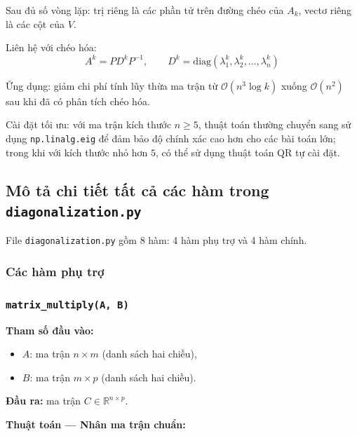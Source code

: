 \documentclass[a4paper,12pt]{report}
\begin{document}
\noindent Sau đủ số vòng lặp: trị riêng là các phần tử trên đường chéo của $A_k$, vectơ riêng là các cột của $V$.

\medskip

\noindent Liên hệ với chéo hóa:
\[
  A^k = P D^k P^{-1}, \qquad
  D^k = \mathrm{diag}(\lambda_1^k, \lambda_2^k, \ldots, \lambda_n^k)
\]

\noindent Ứng dụng: giảm chi phí tính lũy thừa ma trận từ $\mathcal{O}(n^3 \log k)$ xuống $\mathcal{O}(n^2)$ sau khi đã có phân tích chéo hóa.

\medskip

\noindent Cài đặt tối ưu: với ma trận kích thước $n \geq 5$, thuật toán thường chuyển sang sử dụng \texttt{np.linalg.eig} để đảm bảo độ chính xác cao hơn cho các bài toán lớn; trong khi với kích thước nhỏ hơn $5$, có thể sử dụng thuật toán QR tự cài đặt.

\subsection{Mô tả chi tiết tất cả các hàm trong \texttt{diagonalization.py}}
File \texttt{diagonalization.py} gồm 8 hàm: 4 hàm phụ trợ và 4 hàm chính.

\subsubsection{Các hàm phụ trợ}
\subsubsection*{\texttt{matrix\_multiply(A, B)}}

\smallskip

\textbf{Tham số đầu vào:}
\begin{itemize}
  \item $A$: ma trận $n \times m$ (danh sách hai chiều),
  \item $B$: ma trận $m \times p$ (danh sách hai chiều).
\end{itemize}

\textbf{Đầu ra:} ma trận $C \in \mathbb{R}^{n \times p}$.
\medskip

\textbf{Thuật toán --- Nhân ma trận chuẩn:}
\end{document}
